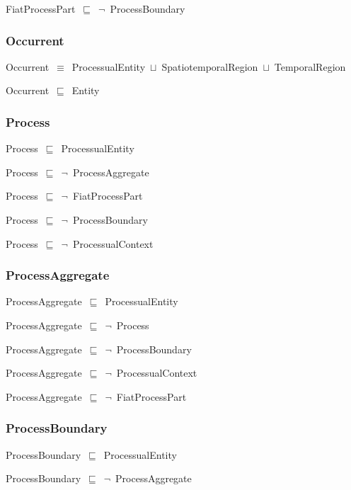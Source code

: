 \documentclass{article}
\begin{document}
FiatProcessPart~\ensuremath{\sqsubseteq}~\ensuremath{\lnot}~ProcessBoundary

\subsubsection*{Occurrent}

Occurrent~\ensuremath{\equiv}~ProcessualEntity~\ensuremath{\sqcup}~SpatiotemporalRegion~\ensuremath{\sqcup}~TemporalRegion

Occurrent~\ensuremath{\sqsubseteq}~Entity~

\subsubsection*{Process}

Process~\ensuremath{\sqsubseteq}~ProcessualEntity~

Process~\ensuremath{\sqsubseteq}~\ensuremath{\lnot}~ProcessAggregate

Process~\ensuremath{\sqsubseteq}~\ensuremath{\lnot}~FiatProcessPart

Process~\ensuremath{\sqsubseteq}~\ensuremath{\lnot}~ProcessBoundary

Process~\ensuremath{\sqsubseteq}~\ensuremath{\lnot}~ProcessualContext

\subsubsection*{ProcessAggregate}

ProcessAggregate~\ensuremath{\sqsubseteq}~ProcessualEntity~

ProcessAggregate~\ensuremath{\sqsubseteq}~\ensuremath{\lnot}~Process

ProcessAggregate~\ensuremath{\sqsubseteq}~\ensuremath{\lnot}~ProcessBoundary

ProcessAggregate~\ensuremath{\sqsubseteq}~\ensuremath{\lnot}~ProcessualContext

ProcessAggregate~\ensuremath{\sqsubseteq}~\ensuremath{\lnot}~FiatProcessPart

\subsubsection*{ProcessBoundary}

ProcessBoundary~\ensuremath{\sqsubseteq}~ProcessualEntity~

ProcessBoundary~\ensuremath{\sqsubseteq}~\ensuremath{\lnot}~ProcessAggregate
\end{document}
